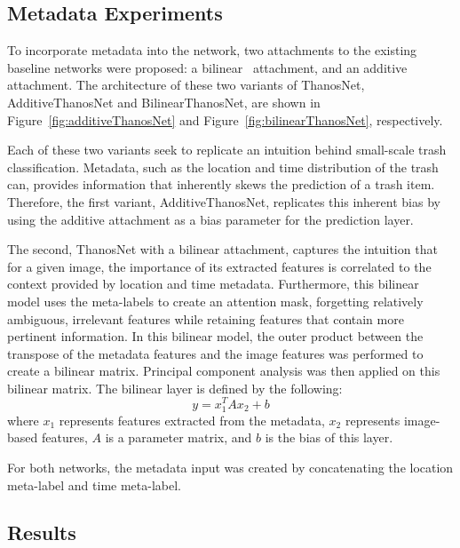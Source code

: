 \documentclass[conference]{ieeeconf}
\begin{document}
\subsection{Metadata Experiments}

To incorporate metadata into the network, two attachments to the existing baseline networks were proposed: a bilinear~\cite{Bilinear} attachment, and an additive attachment. The architecture of these two variants of ThanosNet, AdditiveThanosNet and BilinearThanosNet, are shown in Figure~\ref{fig:additiveThanosNet} and Figure~\ref{fig:bilinearThanosNet}, respectively. 

Each of these two variants seek to replicate an intuition behind small-scale trash classification. Metadata, such as the location and time distribution of the trash can, provides information that inherently skews the prediction of a trash item. Therefore, the first variant, AdditiveThanosNet, replicates this inherent bias by using the additive attachment as a bias parameter for the prediction layer.

The second, ThanosNet with a bilinear attachment, captures the intuition that for a given image, the importance of its extracted features is correlated to the context provided by location and time metadata. Furthermore, this bilinear model uses the meta-labels to create an attention mask, forgetting relatively ambiguous, irrelevant features while retaining features that contain more pertinent information. In this bilinear model, the outer product between the transpose of the metadata features and the image features was performed to create a bilinear matrix. Principal component analysis was then applied on this bilinear matrix. The bilinear layer is defined by the following:
$$y = x_1^TAx_2+b$$
where $x_1$ represents features extracted from the metadata, $x_2$ represents image-based features, $A$ is a parameter matrix, and $b$ is the bias of this layer. 

For both networks, the metadata input was created by concatenating the location meta-label and time meta-label.

\subsection{Results}
\end{document}
